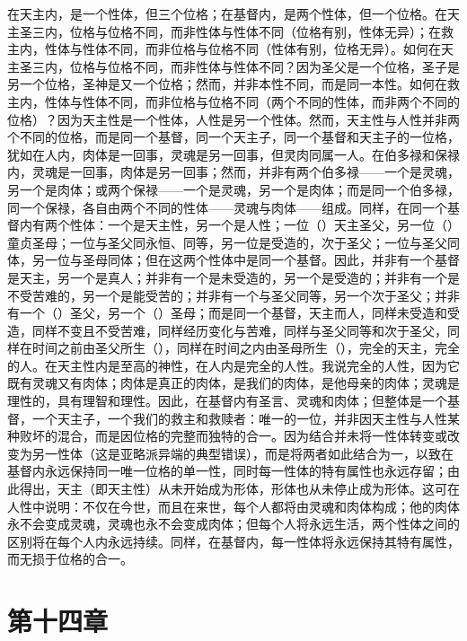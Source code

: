 在天主内，是一个性体，但三个位格；在基督内，是两个性体，但一个位格。在天主圣三内，位格与位格不同，而非性体与性体不同（位格有别，性体无异）；在救主内，性体与性体不同，而非位格与位格不同（性体有别，位格无异）。如何在天主圣三内，位格与位格不同，而非性体与性体不同？因为圣父是一个位格，圣子是另一个位格，圣神是又一个位格；然而，并非本性不同，而是同一本性。如何在救主内，性体与性体不同，而非位格与位格不同（两个不同的性体，而非两个不同的位格）？因为天主性是一个性体，人性是另一个性体。然而，天主性与人性并非两个不同的位格，而是同一个基督，同一个天主子，同一个基督和天主子的一位格，犹如在人内，肉体是一回事，灵魂是另一回事，但灵肉同属一人。在伯多禄和保禄内，灵魂是一回事，肉体是另一回事；然而，并非有两个伯多禄——一个是灵魂，另一个是肉体；或两个保禄——一个是灵魂，另一个是肉体；而是同一个伯多禄，同一个保禄，各自由两个不同的性体——灵魂与肉体——组成。同样，在同一个基督内有两个性体：一个是天主性，另一个是人性；一位（）天主圣父，另一位（）童贞圣母；一位与圣父同永恒、同等，另一位是受造的，次于圣父；一位与圣父同体，另一位与圣母同体；但在这两个性体中是同一个基督。因此，并非有一个基督是天主，另一个是真人；并非有一个是未受造的，另一个是受造的；并非有一个是不受苦难的，另一个是能受苦的；并非有一个与圣父同等，另一个次于圣父；并非有一个（）圣父，另一个（）圣母；而是同一个基督，天主而人，同样未受造和受造，同样不变且不受苦难，同样经历变化与苦难，同样与圣父同等和次于圣父，同样在时间之前由圣父所生（），同样在时间之内由圣母所生（），完全的天主，完全的人。在天主性内是至高的神性，在人内是完全的人性。我说完全的人性，因为它既有灵魂又有肉体；肉体是真正的肉体，是我们的肉体，是他母亲的肉体；灵魂是理性的，具有理智和理性。因此，在基督内有圣言、灵魂和肉体；但整体是一个基督，一个天主子，一个我们的救主和救赎者：唯一的一位，并非因天主性与人性某种败坏的混合，而是因位格的完整而独特的合一。因为结合并未将一性体转变或改变为另一性体（这是亚略派异端的典型错误），而是将两者如此结合为一，以致在基督内永远保持同一唯一位格的单一性，同时每一性体的特有属性也永远存留；由此得出，天主（即天主性）从未开始成为形体，形体也从未停止成为形体。这可在人性中说明：不仅在今世，而且在来世，每个人都将由灵魂和肉体构成；他的肉体永不会变成灵魂，灵魂也永不会变成肉体；但每个人将永远生活，两个性体之间的区别将在每个人内永远持续。同样，在基督内，每一性体将永远保持其特有属性，而无损于位格的合一。\par


\section{第十四章}

